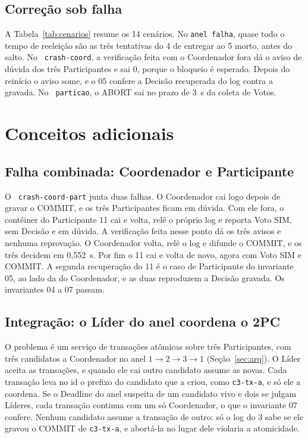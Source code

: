 \documentclass[conference]{IEEEtran}
\newcommand{\cod}[1]{\texttt{\upshape #1}}
\begin{document}
\subsection{Correção sob falha}
A Tabela~\ref{tab:cenarios} resume os 14 cenários. No \cod{anel falha}, quase todo o tempo de
reeleição são as três tentativas do 4 de entregar ao 5 morto, antes do salto. No
\cod{2pc crash-coord}, a verificação feita com o Coordenador fora dá o aviso de dúvida dos três
Participantes e sai 0, porque o bloqueio é esperado. Depois do reinício o aviso some, e o 05
confere a Decisão recuperada do log contra a gravada. No \cod{2pc particao}, o ABORT sai no prazo
de 3~s da coleta de Votos.

\section{Conceitos adicionais}
\label{sec:extras}

\subsection{Falha combinada: Coordenador e Participante}
O \cod{2pc crash-coord-part} junta duas falhas. O Coordenador cai logo depois de gravar o COMMIT, e
os três Participantes ficam em dúvida. Com ele fora, o contêiner do Participante 11 cai e volta,
relê o próprio log e reporta Voto SIM, sem Decisão e em dúvida. A verificação feita nesse ponto dá
os três avisos e nenhuma reprovação. O Coordenador volta, relê o log e difunde o COMMIT, e os três
decidem em 0,552~s. Por fim o 11 cai e volta de novo, agora com Voto SIM e COMMIT. A segunda
recuperação do 11 é o caso de Participante do invariante 05, ao lado da do Coordenador, e as duas
reproduzem a Decisão gravada. Os invariantes 04 a 07 passam.

\subsection{Integração: o Líder do anel coordena o 2PC}
O problema é um serviço de transações atômicas sobre três Participantes, com três candidatos a
Coordenador no anel $1\to2\to3\to1$ (Seção~\ref{sec:arq}). O Líder aceita as transações, e quando
ele cai outro candidato assume as novas. Cada transação leva no id o prefixo do candidato que a
criou, como \cod{c3-tx-a}, e só ele a coordena. Se o Deadline do anel suspeita de um candidato vivo
e dois se julgam Líderes, cada transação continua com um só Coordenador, o que o invariante 07
confere. Nenhum candidato assume a transação de outro: só o log do 3 sabe se ele gravou o COMMIT de
\cod{c3-tx-a}, e abortá-la no lugar dele violaria a atomicidade.
\end{document}
